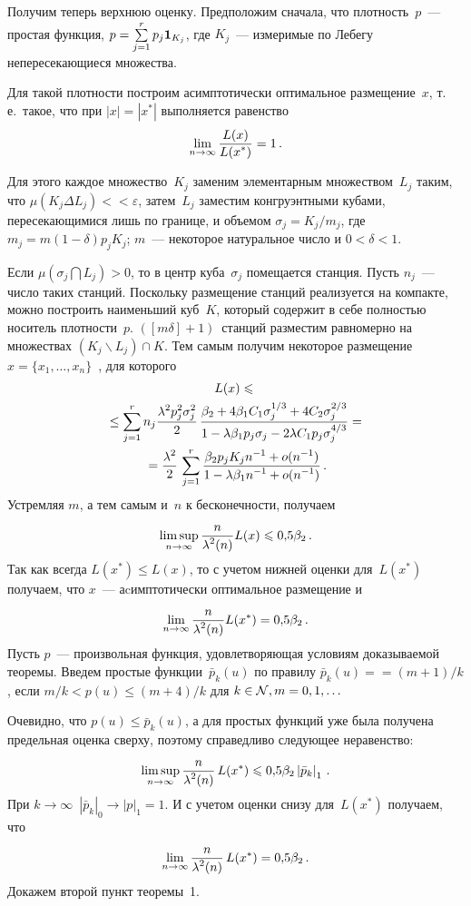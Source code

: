 \begin{multicols}{2}
Получим теперь верхнюю оценку. Предположим сначала, что плотность~$p$~--- простая функция, $p=\sum\limits_{j=1}^{r}p_j
\textbf{1}_{K_j}$, где $K_j$~--- измеримые по Лебегу непересекающиеся множества.

Для такой плотности построим асимптотически оптимальное размещение~$x$, т.\,е.\ такое, что при
$|x|=|x^*|$ выполняется равенство
$$
\lim\limits_{n\to\infty} \displaystyle\frac{\displaystyle L(x)\mathstrut}{\displaystyle L(x^*)\mathstrut}=1\,.
$$

Для этого каждое множество~$K_j$ заменим
элементарным множеством~$L_j$ таким, что $\mu(K_j \Delta L_j)<$\linebreak $<\varepsilon$, затем~$L_j$
заместим конгруэнтными кубами, пересекающимися лишь по границе, и объемом
$\sigma_j=K_j/m_j$, где
$m_j=m (1-\delta) p_jK_j$; $m$~--- некоторое натуральное число и $0<\delta<1$.

Если $\mu(\sigma_j \bigcap L_j)>0$, то в центр куба~$\sigma_j$ помещается станция. Пусть
$n_j$~--- число таких станций. Поскольку размещение станций реализуется на компакте, можно построить наименьший 
куб~$K$, который содержит в себе полностью носитель плотности~$p$. $([m\delta]+1)$~станций 
разместим равномерно на множествах $(K_j\backslash L_j)\cap K$. Тем самым
получим некоторое размещение $x=\{x_1,\ldots,x_n\}$~, для которого
\begin{multline*}
L(x)\leqslant{}\\
{}\le \sum\limits_{j=1}^{r}n_j\displaystyle\frac{\displaystyle \lambda^2 p_j^2 \sigma_j^2\mathstrut}{\displaystyle 2\mathstrut}\, \displaystyle\frac{\displaystyle \beta_2+4\beta_1
C_1\sigma_j^{1/3}+4C_2\sigma_j^{2/3}\mathstrut}{\displaystyle 1-\lambda \beta_1 p_j \sigma_j-2\lambda C_1p_j
\sigma_j^{4/3}\mathstrut}={}\\
{}= \displaystyle\frac{\displaystyle \lambda^2\mathstrut}{\displaystyle 2\mathstrut}\,\sum\limits_{j=1}^{r} \displaystyle\frac{\displaystyle \beta_2 p_j K_j
n^{-1}+o(n^{-1})\mathstrut}{\displaystyle 1-\lambda \beta_1 n^{-1}+o(n^{-1})\mathstrut}\,.
\end{multline*}
Устремляя $m$, а тем самым и~$n$ к бесконечности, получаем
$$
\limsup\limits_{n \to \infty}\displaystyle\frac{\displaystyle n\mathstrut}{\displaystyle \lambda^2(n)\mathstrut}L(x)\leqslant 0{,}5\beta_2\,.
$$
Так как всегда $L(x^*)\leqslant L(x)$, то с учетом нижней оценки для~$L(x^*)$ получаем, что
$x$~--- аcимптотически оптимальное размещение и
$$
\lim\limits_{n \to \infty}\displaystyle\frac{\displaystyle n\mathstrut}{\displaystyle \lambda^2(n)\mathstrut}L(x^*) = 0{,}5\beta_2\,.
$$
Пусть $p$~--- произвольная функция, удовле\-тво\-ря\-ющая условиям доказываемой теоремы. Введем
прос\-тые функции~$\bar{p}_k(u)$ по правилу
$\bar{p}_k(u)=$\linebreak $=(m+1)/k$, если $m/k<p(u)\leqslant (m+4)/k$ для $k\in {\cal N}, m=0,1,\ldots$

Очевидно, что $p(u)\leqslant \bar{p}_{k}(u)$, а для простых функций уже была получена
предельная оценка сверху, поэтому справедливо следующее неравенство:
$$
\limsup\limits_{n \to \infty}\displaystyle\frac{\displaystyle n\mathstrut}{\displaystyle \lambda^2(n)\mathstrut}\,L(x^*)\leqslant 0{,}5\beta_2 \left|\bar{p}_k \right|_1\,.
$$
При $k \to \infty$\ $\left|\bar{p}_k \right|_0 \to \left|p\right|_1=1$. И с учетом оценки
снизу для~$L(x^*)$ получаем, что
$$
\lim\limits_{n \to \infty}\displaystyle\frac{\displaystyle n\mathstrut}{\displaystyle \lambda^2(n)\mathstrut}\,L(x^*) = 0{,}5\beta_2\,.
$$
Докажем второй пункт теоремы~1.
\pagebreak


\end{multicols}
